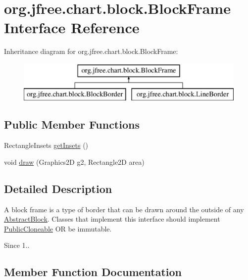 \hypertarget{interfaceorg_1_1jfree_1_1chart_1_1block_1_1_block_frame}{}\section{org.\+jfree.\+chart.\+block.\+Block\+Frame Interface Reference}
\label{interfaceorg_1_1jfree_1_1chart_1_1block_1_1_block_frame}
Inheritance diagram for org.\+jfree.\+chart.\+block.\+Block\+Frame\+:\begin{figure}[H]
\begin{center}
\leavevmode
\includegraphics[height=2.000000cm]{interfaceorg_1_1jfree_1_1chart_1_1block_1_1_block_frame}
\end{center}
\end{figure}
\subsection*{Public Member Functions}
\begin{DoxyCompactItemize}
\item 
Rectangle\+Insets \mbox{\hyperlink{interfaceorg_1_1jfree_1_1chart_1_1block_1_1_block_frame_ae85aa6f391781ca53ae5b4671b6d1154}{get\+Insets}} ()
\item 
void \mbox{\hyperlink{interfaceorg_1_1jfree_1_1chart_1_1block_1_1_block_frame_abd9e0bc4603225750c908ddbcfbb088e}{draw}} (Graphics2D g2, Rectangle2D area)
\end{DoxyCompactItemize}


\subsection{Detailed Description}
A block frame is a type of border that can be drawn around the outside of any \mbox{\hyperlink{classorg_1_1jfree_1_1chart_1_1block_1_1_abstract_block}{Abstract\+Block}}. Classes that implement this interface should implement \mbox{\hyperlink{}{Public\+Cloneable}} OR be immutable.

\begin{DoxySince}{Since}
1.. 
\end{DoxySince}


\subsection{Member Function Documentation}
\mbox{\label{interfaceorg_1_1jfree_1_1chart_1_1block_1_1_block_frame_abd9e0bc4603225750c908ddbcfbb088e}} 
